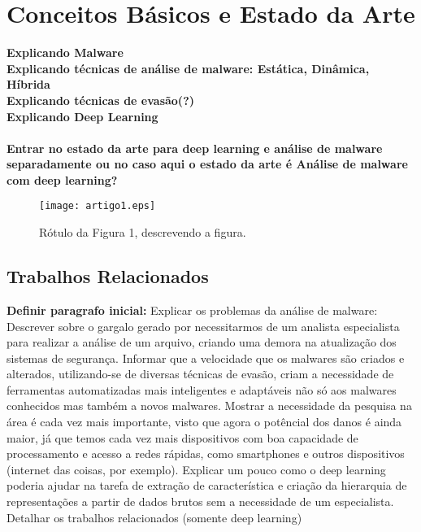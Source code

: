 %
%

\chapter{Conceitos B\'{a}sicos e Estado da Arte}
\textbf{Explicando Malware\\
Explicando técnicas de análise de malware: Estática, Dinâmica, Híbrida\\
Explicando técnicas de evasão(?)\\
Explicando Deep Learning\\\\
Entrar no estado da arte para deep learning e análise de malware separadamente ou no caso aqui o estado da arte é Análise de malware com deep learning?}



\begin{figure}[!h]
	\centering
	\texttt{[image: artigo1.eps]}
	\caption{R\'{o}tulo da Figura 1, descrevendo a figura.}
	\label{fig:artigo1}
\end{figure}

\section{Trabalhos Relacionados}
\textbf{Definir paragrafo inicial:} Explicar os problemas da análise de malware: Descrever sobre o gargalo gerado por necessitarmos de um analista especialista para realizar a análise de um arquivo, criando uma demora na atualização dos sistemas de segurança.  Informar que a velocidade que os malwares são criados e alterados, utilizando-se de diversas técnicas de evasão, criam a necessidade de ferramentas automatizadas mais inteligentes e adaptáveis não só aos malwares conhecidos mas também a novos malwares. Mostrar a necessidade da pesquisa na área é cada vez mais importante, visto que agora o potêncial dos danos é ainda maior, já que temos cada vez mais dispositivos com boa capacidade de processamento e acesso a redes rápidas, como smartphones e outros dispositivos (internet das coisas, por exemplo).
Explicar um pouco como o deep learning poderia ajudar na tarefa de extração de característica e criação da hierarquia de representações a partir de dados brutos sem a necessidade de um especialista. Detalhar os trabalhos relacionados (somente deep learning)

